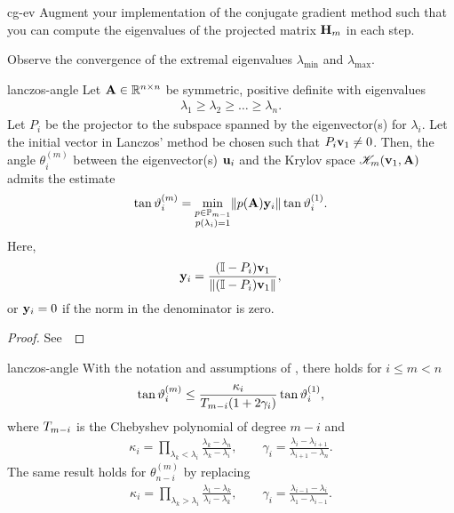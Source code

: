 \begin{Problem}{cg-ev}
  Augment your implementation of the conjugate gradient method such
  that you can compute the eigenvalues of the projected matrix
  $\mathbf H_m$ in each step.

  Observe the convergence of the extremal eigenvalues $\lambda_{\text{min}}$
  and $\lambda_{\text{max}}$.
\end{Problem}

\begin{Lemma}{lanczos-angle}
  Let $\mathbf A\in\mathbb R^{n\times n}$ be symmetric, positive definite with eigenvalues
  \begin{gather}
    \lambda_1 \ge \lambda_2 \ge \dots \ge \lambda_n.
  \end{gather}
  Let $P_i$ be the projector to the subspace spanned by the
  eigenvector(s) for $\lambda_i$. Let the initial vector in Lanczos'
  method be chosen such that $P_i \mathbf v_1\neq 0$. Then, the angle
  $\theta_i^{(m)}$ between the eigenvector(s) $\mathbf u_i$ and the Krylov space
  $\mathscr K_m(\mathbf v_1,\mathbf A)$ admits the estimate
  \begin{gather}
    \tan\vartheta_i^{(m)} = \min_{\substack{p\in\mathbb P_{m-1}\\p(\lambda_i)=1}} \lVert p(\mathbf A)\mathbf y_i\rVert \tan \vartheta_i^{(1)}.
  \end{gather}
  Here,
  \begin{gather}
    \mathbf y_i = \frac{(\mathbb I-P_i)\mathbf v_1}{\lVert(\mathbb I-P_i)\mathbf v_1\rVert},
  \end{gather}
  or $\mathbf y_i=0$ if the norm in the denominator is zero.
\end{Lemma}

\begin{proof}
  See~\cite[Lemma 6.1]{Saad11}
\end{proof}

\begin{Theorem}{lanczos-angle}
  With the notation and assumptions of , there holds for $i\le m < n$
  \begin{gather}
    \tan\vartheta_i^{(m)} \le \frac{\kappa_i}{T_{m-i}(1+2\gamma_i)}\tan\vartheta_i^{(1)},
  \end{gather}
  where $T_{m-i}$ is the Chebyshev polynomial of degree $m-i$ and
  \begin{gather}
    \kappa_i=\prod_{\lambda_k < \lambda_i} \frac{\lambda_k-\lambda_n}{\lambda_k-\lambda_i},
    \qquad \gamma_i = \frac{\lambda_{i}-\lambda_{i+1}}{\lambda_{i+1}-\lambda_{n}}.
  \end{gather}
  The same result holds for $\theta_{n-i}^{(m)}$ by replacing
  \begin{gather}
    \kappa_i=\prod_{\lambda_k > \lambda_i} \frac{\lambda_1-\lambda_k}{\lambda_i-\lambda_k},
    \qquad \gamma_i = \frac{\lambda_{i-1}-\lambda_{i}}{\lambda_{1}-\lambda_{i-1}}.
  \end{gather}  
\end{Theorem}

